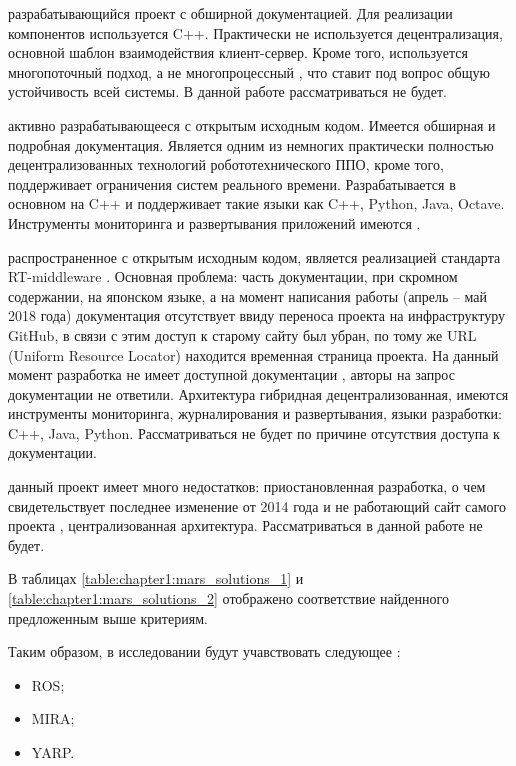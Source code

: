 \begin{description}[noitemsep]
	\item [SmartSoft] разрабатывающийся проект с обширной документацией. Для реализации компонентов используется C++. Практически не используется децентрализация, основной шаблон взаимодействия клиент-сервер. Кроме того, используется многопоточный подход, а не многопроцессный \cite{smartsoft-main-site}, что ставит под вопрос общую устойчивость всей системы. В данной работе рассматриваться не будет.
	
	\item [YARP] активно разрабатывающееся \marm{} с открытым исходным кодом. Имеется обширная и подробная документация. Является одним из немногих практически полностью децентрализованных технологий робототехнического ППО, кроме того, поддерживает ограничения систем реального времени. Разрабатывается в основном на C++ и поддерживает такие языки как C++, Python, Java, Octave. Инструменты мониторинга и развертывания приложений имеются \cite{yarp-main-site}.
	
	\item [OpenRTM-aist] распространенное \marm{} с открытым исходным кодом, является реализацией стандарта RT-middleware \cite{openrtmaist-old-site}. Основная проблема: часть документации, при скромном содержании, на японском языке, а на момент написания работы (апрель -- май 2018 года) документация отсутствует ввиду переноса проекта на инфраструктуру GitHub, в связи с этим доступ к старому сайту был убран, по тому же URL (Uniform Resource Locator) находится временная страница проекта. На данный момент разработка не имеет доступной документации \cite{openrtmaist-new-site}, авторы на запрос документации не ответили. Архитектура гибридная децентрализованная, имеются инструменты мониторинга, журналирования и развертывания, языки разработки: C++, Java, Python. Рассматриваться не будет по причине отсутствия доступа к документации.
	
	\item [URBI] данный проект имеет много недостатков: приостановленная разработка, о чем свидетельствует последнее изменение от 2014 года \cite{urbi-repo} и не работающий сайт самого проекта \cite{urbi-main-site}, централизованная архитектура. Рассматриваться в данной работе не будет. 
\end{description}

В таблицах \ref{table:chapter1:mars_solutions_1} и \ref{table:chapter1:mars_solutions_2} отображено соответствие найденного \marm{} предложенным выше критериям.

Таким образом, в исследовании будут учавствовать следующее \marm{}:
\begin{itemize}[noitemsep]
	\item ROS;
	\item MIRA;
	\item YARP.
\end{itemize}


